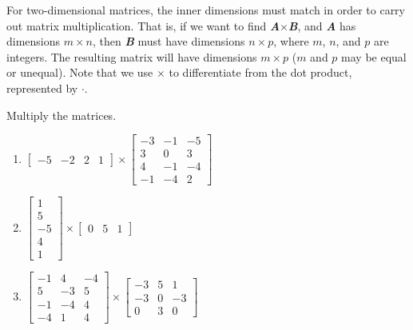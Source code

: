 \begin{mdframed}[style = important, frametitle = {Matrix Multiplication}]
For two-dimensional matrices, the inner dimensions must match in order to
carry out matrix multiplication. 
That is, if we want to find \textbf{\textit{
A}}$\times$\textbf{\textit{B}}, and \textbf{\textit{A}} has dimensions $m
\times n$, then \textbf{\textit{B}} must have dimensions $n \times p$, where
$m$, $n$, and $p$ are integers. The resulting matrix will have dimensions $m
\times p$ ($m$ and $p$ may be equal or unequal). Note that we use $\times$ to differentiate from the dot product, represented by $\cdot$. 
\end{mdframed}

\begin{Exercise}[title = {Multiplying Matrices 1}, label = mult_mat1]
Multiply the matrices.
\begin{enumerate}
\item $\begin{bmatrix}
-5 & -2 & 2 & 1
\end{bmatrix} \times \begin{bmatrix}
-3 & -1 & -5\\
3 & 0 & 3\\
4 & -1 & -4\\
-1 & -4 & 2
\end{bmatrix}$
\item $\begin{bmatrix}
1\\
5\\
-5\\
4\\
1
\end{bmatrix} \times \begin{bmatrix}
0 & 5 & 1
\end{bmatrix}$
\item $\begin{bmatrix}
-1 & 4 & -4\\
5 & -3 & 5\\
-1 & -4 & 4\\
-4 & 1 & 4
\end{bmatrix} \times \begin{bmatrix}
-3 & 5 & 1\\
-3 & 0 & -3\\
0 & 3 & 0
\end{bmatrix}$
\end{enumerate}
\end{Exercise}

